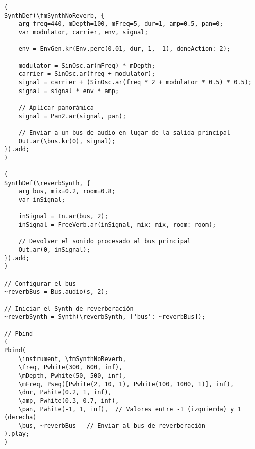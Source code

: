 \begin{minipage}[t]{1\textwidth}
    \centering
    \begin{lstlisting}[style=SuperCollider-IDE, basicstyle=\footnotesize\ttfamily, numbers=none]
(
SynthDef(\fmSynthNoReverb, {
    arg freq=440, mDepth=100, mFreq=5, dur=1, amp=0.5, pan=0;
    var modulator, carrier, env, signal;

    env = EnvGen.kr(Env.perc(0.01, dur, 1, -1), doneAction: 2);

    modulator = SinOsc.ar(mFreq) * mDepth;
    carrier = SinOsc.ar(freq + modulator);
    signal = carrier + (SinOsc.ar(freq * 2 + modulator * 0.5) * 0.5);
    signal = signal * env * amp;

    // Aplicar panorámica
    signal = Pan2.ar(signal, pan);

    // Enviar a un bus de audio en lugar de la salida principal
    Out.ar(\bus.kr(0), signal);
}).add;
)

(
SynthDef(\reverbSynth, {
    arg bus, mix=0.2, room=0.8;
    var inSignal;

    inSignal = In.ar(bus, 2);
    inSignal = FreeVerb.ar(inSignal, mix: mix, room: room);

    // Devolver el sonido procesado al bus principal
    Out.ar(0, inSignal);
}).add;
)

// Configurar el bus
~reverbBus = Bus.audio(s, 2);

// Iniciar el Synth de reverberación
~reverbSynth = Synth(\reverbSynth, ['bus': ~reverbBus]);

// Pbind
(
Pbind(
    \instrument, \fmSynthNoReverb,
    \freq, Pwhite(300, 600, inf),
    \mDepth, Pwhite(50, 500, inf),
    \mFreq, Pseq([Pwhite(2, 10, 1), Pwhite(100, 1000, 1)], inf),
    \dur, Pwhite(0.2, 1, inf),
    \amp, Pwhite(0.3, 0.7, inf),
    \pan, Pwhite(-1, 1, inf),  // Valores entre -1 (izquierda) y 1 (derecha)
    \bus, ~reverbBus   // Enviar al bus de reverberación
).play;
)                                
    \end{lstlisting}
    \vspace{1cm}
\end{minipage}





















